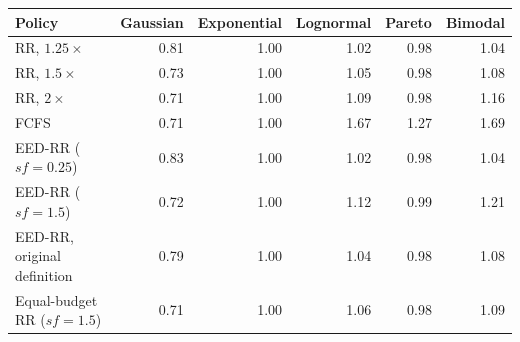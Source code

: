 \begin{tabular}{lrrrrr}
\toprule
Policy & Gaussian & Exponential & Lognormal & Pareto & Bimodal \\
\midrule
RR, $1.25\times$ & 0.81 & 1.00 & 1.02 & 0.98 & 1.04 \\
RR, $1.5\times$ & 0.73 & 1.00 & 1.05 & 0.98 & 1.08 \\
RR, $2\times$ & 0.71 & 1.00 & 1.09 & 0.98 & 1.16 \\
FCFS & 0.71 & 1.00 & 1.67 & 1.27 & 1.69 \\
EED-RR ($sf=0.25$) & 0.83 & 1.00 & 1.02 & 0.98 & 1.04 \\
EED-RR ($sf=1.5$) & 0.72 & 1.00 & 1.12 & 0.99 & 1.21 \\
EED-RR, original definition & 0.79 & 1.00 & 1.04 & 0.98 & 1.08 \\
Equal-budget RR ($sf=1.5$) & 0.71 & 1.00 & 1.06 & 0.98 & 1.09 \\
\bottomrule
\end{tabular}